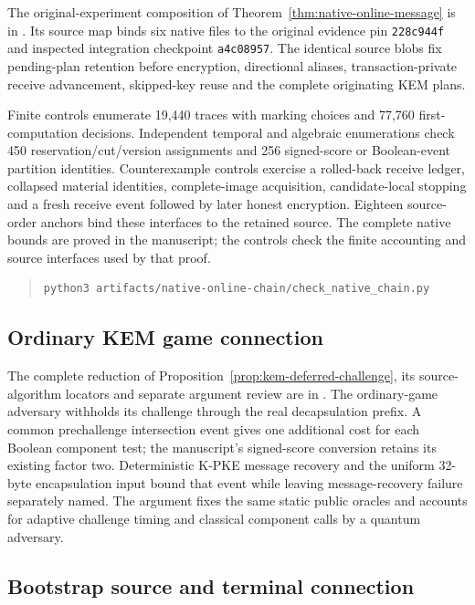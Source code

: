\documentclass[pdflatex]{sn-jnl}
\theoremstyle{thmstyleone}
\theoremstyle{thmstylethree}
\theoremstyle{thmstyletwo}
\begin{document}
The original-experiment composition of
Theorem~\ref{thm:native-online-message} is in
. Its source map binds six native
files to the original evidence pin \texttt{228c944f} and inspected
integration checkpoint \texttt{a4c08957}. The identical source blobs
fix pending-plan retention before encryption, directional aliases,
transaction-private receive advancement, skipped-key reuse and the
complete originating KEM plans.

Finite controls enumerate 19,440 traces with marking choices and
77,760 first-computation decisions. Independent temporal and algebraic
enumerations check 450 reservation/cut/version assignments and 256
signed-score or Boolean-event partition identities. Counterexample
controls exercise a rolled-back receive ledger, collapsed material
identities, complete-image acquisition, candidate-local stopping and
a fresh receive event followed by later honest encryption. Eighteen
source-order anchors bind these interfaces to the retained source.
The complete native bounds are proved in the manuscript; the controls
check the finite accounting and source interfaces used by that proof.
\begin{quote}
\small
\begin{verbatim}
python3 artifacts/native-online-chain/check_native_chain.py
\end{verbatim}
\end{quote}

\subsection{Ordinary KEM game connection}
\label{app:kem-ordinary-bridge}

The complete reduction of
Proposition~\ref{prop:kem-deferred-challenge}, its source-algorithm
locators and separate argument review are in
. The ordinary-game adversary withholds
its challenge through the real decapsulation prefix. A common
prechallenge intersection event gives one additional cost for each
Boolean component test; the manuscript's signed-score conversion
retains its existing factor two. Deterministic K-PKE message recovery
and the uniform 32-byte encapsulation input bound that event while
leaving message-recovery failure separately named. The argument fixes
the same static public oracles and accounts for adaptive challenge
timing and classical component calls by a quantum adversary.


\subsection{Bootstrap source and terminal connection}
\label{app:bootstrap-artifacts}
\end{document}
